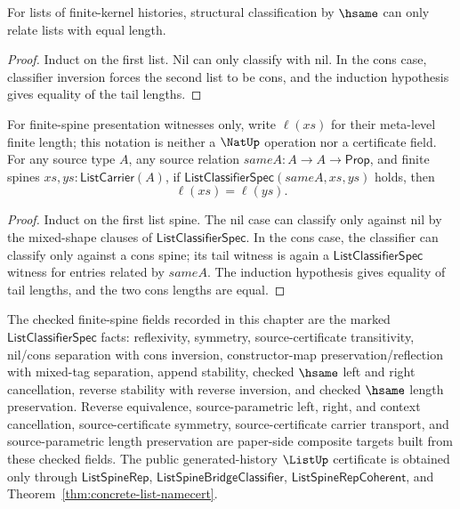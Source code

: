 \begin{theorem}
\label{thm:list-classifier-hsame-length-eq}
For lists of finite-kernel histories, structural classification by \(\hsame\) can only relate lists with equal length.
\end{theorem}
\begin{proof}
Induct on the first list. Nil can only classify with nil. In the cons case, classifier inversion forces the second list to be cons, and the induction hypothesis gives equality of the tail lengths.
\end{proof}

\begin{theorem}
\label{thm:list-classifier-length-eq}
For finite-spine presentation witnesses only, write $\ell(xs)$ for their meta-level finite length; this notation is neither a $\NatUp$ operation nor a certificate field. For any source type $A$, any source relation $sameA:A\to A\to\mathsf{Prop}$, and finite spines $xs,ys:\mathsf{ListCarrier}(A)$, if
$\mathsf{ListClassifierSpec}(sameA,xs,ys)$ holds, then
$$
\ell(xs)=\ell(ys).
$$
\end{theorem}
\begin{proof}
Induct on the first list spine. The nil case can classify only against nil by the mixed-shape clauses of $\mathsf{ListClassifierSpec}$. In the cons case, the classifier can classify only against a cons spine; its tail witness is again a $\mathsf{ListClassifierSpec}$ witness for entries related by $sameA$. The induction hypothesis gives equality of tail lengths, and the two cons lengths are equal.
\end{proof}

\begin{definition}
\label{def:list-stability-certificate}
The checked finite-spine fields recorded in this chapter are the marked $\mathsf{ListClassifierSpec}$ facts:
reflexivity, symmetry, source-certificate transitivity, nil/cons separation with cons inversion,
constructor-map preservation/reflection with mixed-tag separation, append stability,
checked $\hsame$ left and right cancellation, reverse stability with reverse inversion, and checked $\hsame$ length preservation.
Reverse equivalence, source-parametric left, right, and context cancellation,
source-certificate symmetry, source-certificate carrier transport, and source-parametric length preservation are paper-side composite targets built from these checked fields.
The public generated-history $\ListUp$ certificate is obtained only through $\mathsf{ListSpineRep}$,
$\mathsf{ListSpineBridgeClassifier}$, $\mathsf{ListSpineRepCoherent}$, and Theorem~\ref{thm:concrete-list-namecert}.
\end{definition}

